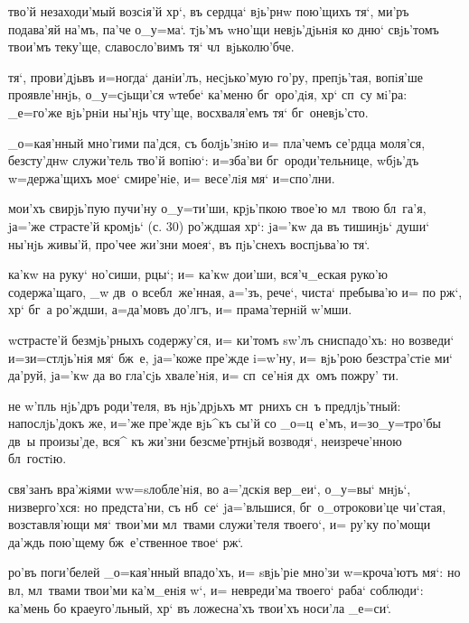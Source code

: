
 тво'й незаходи'мый возсiя'й 
хр`, въ сердца` вjь'рнw пою'щихъ тя`, ми'ръ подава'яй 
на'мъ, па'че о_у=ма`. тjь'мъ w\т но'щи невjь'дjьнiя ко 
дню` свjь'томъ твои'мъ теку'ще, славосло'вимъ тя` 
чл~вjьколю'бче.

 тя`, прови'дjьвъ и=ногда` данiи'лъ, 
несjько'мую го'ру, препjь'тая, вопiя'ше проявле'ннjь, 
о_у=сjьщи'ся w\т тебе` ка'меню бг~оро'дiя, хр` сп~су 
мi'ра: _е=го'же вjь'рнiи ны'нjь чту'ще, восхваля'емъ тя` 
бг~оневjь'сто.

 _о=кая'нный мно'гими па'дся, съ болjь'знiю 
и= пла'чемъ се'рдца моля'ся, безсту'днw служи'тель тво'й 
вопiю`: и=зба'ви бг~ороди'тельнице, w\т бjь'дъ 
w=держа'щихъ мое` смире'нiе, и= весе'лiя мя` и=спо'лни.

  мои'хъ свирjь'пую пучи'ну 
о_у=ти'ши, крjь'пкою твое'ю мл~твою бл~га'я, jа='же 
страсте'й кромjь` (с. 30) ро'ждшая хр`: jа='кw да въ 
тишинjь` души` ны'нjь живы'й, про'чее жи'зни моея`, въ 
пjь'снехъ воспjьва'ю тя`.

   ка'кw на руку` но'сиши, рцы`; и= 
ка'кw дои'ши, вся'ч_еская руко'ю содержа'щаго, _w дв~о 
всебл~же'нная, а='зъ, рече`, чиста` пребыва'ю и= по 
рж`, хр` бг~а ро'ждши, а=да'мовъ до'лгъ, и= 
прама'тернiй w'мши.


 w\т страсте'й безмjь'рныхъ 
содержу'ся, и= ки'томъ sw'лъ сниспадо'хъ: но возведи` 
и=з\ъ и=стлjь'нiя мя` бж~е, jа='коже пре'жде i=w'ну, и= 
вjь'рою безстра'стiе ми` да'руй, jа='кw да во гла'сjь 
хвале'нiя, и= сп~се'нiя дх~омъ пожру' ти.

 не w'пль нjь'дръ роди'теля, въ 
нjь'дрjьхъ мт~рнихъ сн~ъ предлjь'тный: напослjь'докъ же, 
и='же пре'жде вjь^къ сы'й со _о=ц~е'мъ, и=з\ъ о_у=тро'бы 
дв~ы произы'де, вся^ къ жи'зни безсме'ртнjьй возводя`, 
неизрече'нною бл~гостiю.

 свя'занъ вра'жiями w\т w=sлобле'нiя, во 
а='дскiя вер_еи`, о_у=вы` мнjь`, низверго'хся: но 
предста'ни, съ нб~се` jа='вльшися, бг~о_отрокови'це 
чи'стая, возставля'ющи мя` твои'ми мл~твами служи'теля 
твоего`, и= ру'ку по'мощи да'ждь пою'щему бж~е'ственное 
твое` рж`.

  ро'въ поги'белей _о=кая'нный впадо'хъ, и= 
sвjь'рiе мно'зи w=кроча'ютъ мя`: но вл, мл~твами 
твои'ми ка'м_енiя w`, и= невреди'ма твоего` раба` 
соблюди`: ка'мень бо краеуго'льный, хр` въ ложесна'хъ 
твои'хъ носи'ла _е=си`.

